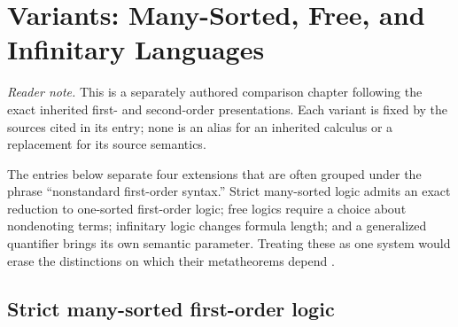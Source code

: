 
\chapter[Variants of First-Order Logic]{Variants: Many-Sorted, Free, and Infinitary Languages}
\label{sec:p02-variants}

\noindent\textit{Reader note.}  This is a separately authored comparison
chapter following the exact inherited first- and second-order presentations.
Each variant is fixed by the sources cited in its entry; none is an alias for
an inherited calculus or a replacement for its source semantics.

The entries below separate four extensions that are often grouped under the
phrase ``nonstandard first-order syntax.''  Strict many-sorted logic admits an
exact reduction to one-sorted first-order logic; free logics require a choice
about nondenoting terms; infinitary logic changes formula length; and a
generalized quantifier brings its own semantic parameter.  Treating these as
one system would erase the distinctions on which their metatheorems depend
\cite{Manzano1996,Lindstrom1969}.

\section{Strict many-sorted first-order logic}
\label{sec:p02-many-sorted}

